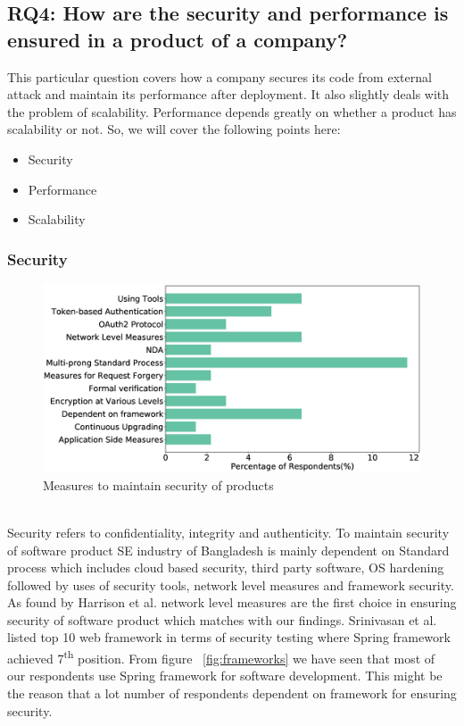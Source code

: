 \subsection{RQ4: How are the security and performance is ensured in a product of a company?}
\label{RQ4}
This particular question covers how a company secures its code from external attack and maintain its performance after deployment. It also slightly deals with the problem of scalability. Performance depends greatly on whether a product has scalability or not. So, we will cover the following points here:
\begin{itemize}
    \item Security
    \item Performance
    \item Scalability
\end{itemize}
\subsubsection{Security}
\label{Security}
\begin{figure}[htbp]
\includegraphics[scale=0.28]{Figures/Security.eps} 
\caption{Measures to maintain security of products}
\label{fig:Measures to ensure security}
\end{figure}
\hfill\\
Security refers to confidentiality, integrity and authenticity. To maintain security of software product SE industry of Bangladesh is mainly dependent on Standard process which includes cloud based security, third party software, OS hardening followed by uses of security tools, network level measures and framework security. As found by Harrison et al.\cite{Harrison2010} network level measures are the first choice in ensuring security of software product which matches with our findings. Srinivasan et al.\cite{Srinivasan2017} listed top 10 web framework in terms of security testing where Spring framework achieved 7\textsuperscript{th} position. From figure ~\ref{fig:frameworks} we have seen that most of our respondents use Spring framework for software development. This might be the reason that a lot number of respondents dependent on framework for ensuring security.
